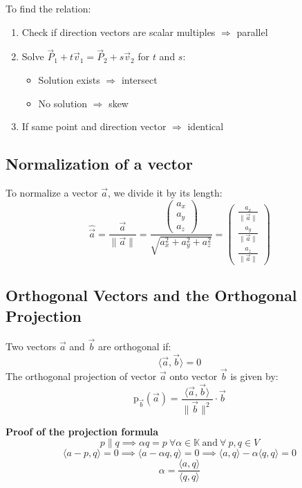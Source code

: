 To find the relation:
\begin{enumerate}
	\item Check if direction vectors are scalar multiples \(\Rightarrow\) parallel
	\item Solve \(\vec{P}_1 + t\vec{v}_1 = \vec{P}_2 + s\vec{v}_2\) for \(t\) and \(s\):
	      \begin{itemize}
		      \item Solution exists \(\Rightarrow\) intersect
		      \item No solution \(\Rightarrow\) skew
	      \end{itemize}
	\item If same point and direction vector \(\Rightarrow\) identical
\end{enumerate}

\subsection{Normalization of a vector}
To normalize a vector \(\vec{a}\), we divide it by its length:
\[
	\hat{\vec{a}} = \frac{\vec{a}}{\|\vec{a}\|} = \frac{\begin{pmatrix} a_x \\ a_y \\ a_z \end{pmatrix}}{\sqrt{a_x^2 + a_y^2 + a_z^2}} = \begin{pmatrix} \frac{a_x}{\|\vec{a}\|} \\ \frac{a_y}{\|\vec{a}\|} \\ \frac{a_z}{\|\vec{a}\|} \end{pmatrix}
\]

\subsection{Orthogonal Vectors and the Orthogonal Projection}
Two vectors \(\vec{a}\) and \(\vec{b}\) are orthogonal if:
\[
	\langle\vec{a}, \vec{b}\rangle = 0
\]
The orthogonal projection of vector \(\vec{a}\) onto vector \(\vec{b}\) is given by:
\[
	\text{p}_{\vec{b}}(\vec{a}) = \frac{\langle\vec{a}, \vec{b}\rangle}{\|\vec{b}\|^2} \cdot \vec{b}
\]

\textbf{Proof of the projection formula}
\[
	p \| q \implies \alpha q = p\ \forall \alpha \in \mathbb{K}\ \text{and}\ \forall\ p, q \in V
\]
\[
	\langle a - p, q\rangle = 0 \implies \langle a - \alpha q, q\rangle = 0 \implies \langle a, q\rangle - \alpha \langle q, q\rangle = 0
\]
\[
	\alpha = \frac{\langle a, q\rangle}{\langle q, q\rangle}
\]


